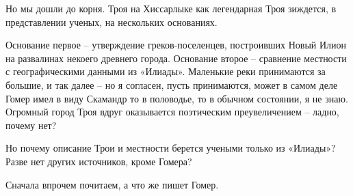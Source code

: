 Но мы дошли до корня. Троя на Хиссарлыке как легендарная Троя зиждется, в представлении ученых, на нескольких основаниях. 

Основание первое – утверждение греков-поселенцев, построивших Новый Илион на развалинах некоего древнего города. Основание второе – сравнение местности с географическими данными из «Илиады». Маленькие реки принимаются за большие, и так далее – но я согласен, пусть принимаются, может в самом деле Гомер имел в виду Скамандр то в половодье, то в обычном состоянии, я не знаю. Огромный город Троя вдруг оказывается поэтическим преувеличением – ладно, почему нет?

Но почему описание Трои и местности берется учеными только из «Илиады»? Разве нет других источников, кроме Гомера?

Сначала впрочем почитаем, а что же пишет Гомер.
